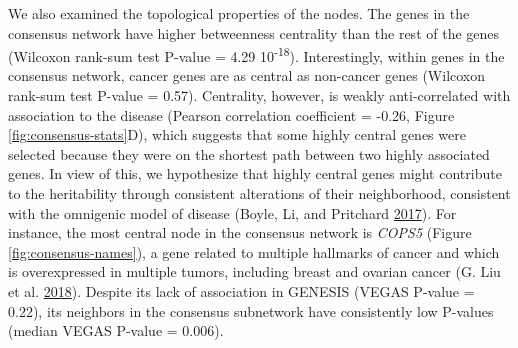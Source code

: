 \documentclass[
  11pt,
]{env/yjiao}
\begin{document}
We also examined the topological properties of the nodes. The genes in
the consensus network have higher betweenness centrality than the rest
of the genes (Wilcoxon rank-sum test P-value = 4.29 10\textsuperscript{-18}).
Interestingly, within genes in the consensus network, cancer genes are
as central as non-cancer genes (Wilcoxon rank-sum test P-value = 0.57).
Centrality, however, is weakly anti-correlated with association to the
disease (Pearson correlation coefficient = -0.26, Figure
\ref{fig:consensus-stats}D), which suggests that some highly
central genes were selected because they were on the shortest path
between two highly associated genes. In view of this, we hypothesize
that highly central genes might contribute to the heritability through
consistent alterations of their neighborhood, consistent with the
omnigenic model of disease (Boyle, Li, and Pritchard \protect\hyperlink{ref-boyle_expanded_2017}{2017}). For instance, the
most central node in the consensus network is \emph{COPS5}
(Figure \ref{fig:consensus-names}), a gene related to multiple hallmarks
of cancer and which is overexpressed in multiple tumors, including
breast and ovarian cancer (G. Liu et al. \protect\hyperlink{ref-liu_jab1_cops5_2018}{2018}). Despite its lack of
association in GENESIS (VEGAS P-value = 0.22), its neighbors in the
consensus subnetwork have consistently low P-values (median VEGAS
P-value = 0.006).
\end{document}

